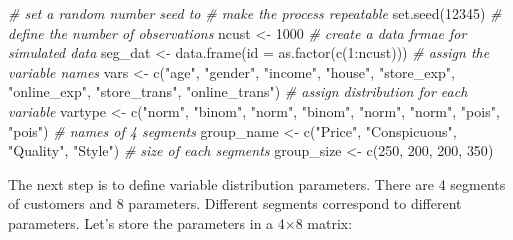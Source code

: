 \documentclass[
  12pt,
]{krantz}
\makeatletter
\newenvironment{Shaded}{\begin{snugshade}}{\end{snugshade}}
\newcommand{\AttributeTok}[1]{\textcolor[rgb]{0.61,0.61,0.61}{#1}}
\newcommand{\CommentTok}[1]{\textcolor[rgb]{0.37,0.37,0.37}{\textit{#1}}}
\newcommand{\DecValTok}[1]{\textcolor[rgb]{0.06,0.06,0.06}{#1}}
\newcommand{\FunctionTok}[1]{\textcolor[rgb]{0,0,0}{#1}}
\newcommand{\NormalTok}[1]{#1}
\newcommand{\OtherTok}[1]{\textcolor[rgb]{0.37,0.37,0.37}{#1}}
\newcommand{\SpecialCharTok}[1]{\textcolor[rgb]{0,0,0}{#1}}
\newcommand{\StringTok}[1]{\textcolor[rgb]{0.5,0.5,0.5}{#1}}
\newenvironment{kframe}{%
\medskip{}
\setlength{\fboxsep}{.8em}
 \def\at@end@of@kframe{}%
 \ifinner\ifhmode%
  \def\at@end@of@kframe{\end{minipage}}%
  \begin{minipage}{\columnwidth}%
 \fi\fi%
 \def\FrameCommand##1{\hskip\@totalleftmargin \hskip-\fboxsep
 \colorbox{shadecolor}{##1}\hskip-\fboxsep
     \hskip-\linewidth \hskip-\@totalleftmargin \hskip\columnwidth}%
 \MakeFramed {\advance\hsize-\width
   \@totalleftmargin\z@ \linewidth\hsize
   \@setminipage}}%
 {\par\unskip\endMakeFramed%
 \at@end@of@kframe}
\renewenvironment{Shaded}{\begin{kframe}}{\end{kframe}}
\makeatother
\begin{document}
\begin{Shaded}
\begin{Highlighting}[]
\CommentTok{\# set a random number seed to }
\CommentTok{\# make the process repeatable}
\FunctionTok{set.seed}\NormalTok{(}\DecValTok{12345}\NormalTok{)}
\CommentTok{\# define the number of observations}
\NormalTok{ncust }\OtherTok{\textless{}{-}} \DecValTok{1000}
\CommentTok{\# create a data frmae for simulated data}
\NormalTok{seg\_dat }\OtherTok{\textless{}{-}} \FunctionTok{data.frame}\NormalTok{(}\AttributeTok{id =} \FunctionTok{as.factor}\NormalTok{(}\FunctionTok{c}\NormalTok{(}\DecValTok{1}\SpecialCharTok{:}\NormalTok{ncust)))}
\CommentTok{\# assign the variable names}
\NormalTok{vars }\OtherTok{\textless{}{-}} \FunctionTok{c}\NormalTok{(}\StringTok{"age"}\NormalTok{, }\StringTok{"gender"}\NormalTok{, }\StringTok{"income"}\NormalTok{, }\StringTok{"house"}\NormalTok{, }\StringTok{"store\_exp"}\NormalTok{, }
    \StringTok{"online\_exp"}\NormalTok{, }\StringTok{"store\_trans"}\NormalTok{, }\StringTok{"online\_trans"}\NormalTok{)}
\CommentTok{\# assign distribution for each variable}
\NormalTok{vartype }\OtherTok{\textless{}{-}} \FunctionTok{c}\NormalTok{(}\StringTok{"norm"}\NormalTok{, }\StringTok{"binom"}\NormalTok{, }\StringTok{"norm"}\NormalTok{, }\StringTok{"binom"}\NormalTok{, }\StringTok{"norm"}\NormalTok{, }\StringTok{"norm"}\NormalTok{, }
    \StringTok{"pois"}\NormalTok{, }\StringTok{"pois"}\NormalTok{)}
\CommentTok{\# names of 4 segments}
\NormalTok{group\_name }\OtherTok{\textless{}{-}} \FunctionTok{c}\NormalTok{(}\StringTok{"Price"}\NormalTok{, }\StringTok{"Conspicuous"}\NormalTok{, }\StringTok{"Quality"}\NormalTok{, }\StringTok{"Style"}\NormalTok{)}
\CommentTok{\# size of each segments}
\NormalTok{group\_size }\OtherTok{\textless{}{-}} \FunctionTok{c}\NormalTok{(}\DecValTok{250}\NormalTok{, }\DecValTok{200}\NormalTok{, }\DecValTok{200}\NormalTok{, }\DecValTok{350}\NormalTok{)}
\end{Highlighting}
\end{Shaded}

The next step is to define variable distribution parameters. There are 4 segments of customers and 8 parameters. Different segments correspond to different parameters. Let's store the parameters in a 4×8 matrix:
\end{document}
